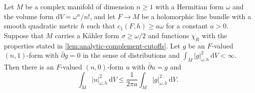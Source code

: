 \begin{lemma}\label{lem:kahler-bundle-l2-estimate}
Let $M$ be a complex manifold of dimension $n\geq1$ with a Hermitian form $\omega$ and the volume form $\mathrm dV=\omega^n/n!$, and let $F\to M$ be a holomorphic line bundle with a smooth quadratic metric $h$ such that $c_1(F,h)\geq a\omega$ for a constant $a>0$. Suppose that $M$ carries a K\"ahler form $\sigma\geq\omega/2$ and functions $\chi_R$ with the properties stated in \cref{lem:analytic-complement-cutoffs}. Let $g$ be an $F$-valued $(n,1)$-form with $\bar\partial g=0$ in the sense of distributions and $\int_M|g|_{\omega,h}^2\,\mathrm dV<\infty$. Then there is an $F$-valued $(n,0)$-form $u$ with $\bar\partial u=g$ and
\begin{equation}\label{eq:compact-bundle-l2-estimate}
 \int_M|u|_{\omega,h}^2\,\mathrm dV
       \leq\frac1{2\pi a}\int_M|g|_{\omega,h}^2\,\mathrm dV.
\end{equation}
\end{lemma}
